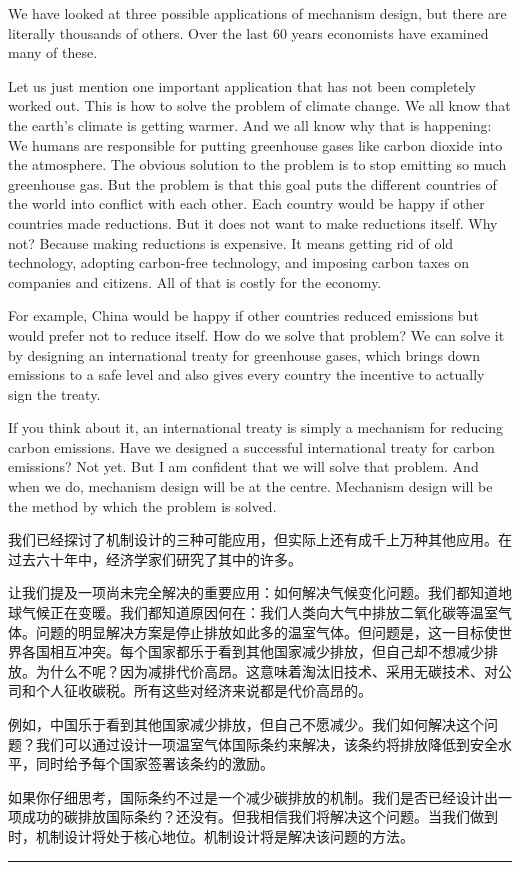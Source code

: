 \documentclass[12pt,a4paper]{article}
\newenvironment{original}{%
  \par\vspace{4pt}\noindent%
  \color{black}%
  \ignorespaces
}{%
  \par\vspace{2pt}%
}
\newenvironment{translation}{%
  \par\vspace{2pt}\noindent%
  \color{transblue}%
  \ignorespaces
}{%
  \par\vspace{4pt}\hrule\vspace{6pt}%
}
\begin{document}
\begin{original}
We have looked at three possible applications of mechanism design, but there are literally thousands of others. Over the last 60 years economists have examined many of these.

Let us just mention one important application that has not been completely worked out. This is how to solve the problem of climate change. We all know that the earth's climate is getting warmer. And we all know why that is happening: We humans are responsible for putting greenhouse gases like carbon dioxide into the atmosphere. The obvious solution to the problem is to stop emitting so much greenhouse gas. But the problem is that this goal puts the different countries of the world into conflict with each other. Each country would be happy if other countries made reductions. But it does not want to make reductions itself. Why not? Because making reductions is expensive. It means getting rid of old technology, adopting carbon-free technology, and imposing carbon taxes on companies and citizens. All of that is costly for the economy.

For example, China would be happy if other countries reduced emissions but would prefer not to reduce itself. How do we solve that problem? We can solve it by designing an international treaty for greenhouse gases, which brings down emissions to a safe level and also gives every country the incentive to actually sign the treaty.

If you think about it, an international treaty is simply a mechanism for reducing carbon emissions. Have we designed a successful international treaty for carbon emissions? Not yet. But I am confident that we will solve that problem. And when we do, mechanism design will be at the centre. Mechanism design will be the method by which the problem is solved.
\end{original}
\begin{translation}
我们已经探讨了机制设计的三种可能应用，但实际上还有成千上万种其他应用。在过去六十年中，经济学家们研究了其中的许多。

让我们提及一项尚未完全解决的重要应用：如何解决气候变化问题。我们都知道地球气候正在变暖。我们都知道原因何在：我们人类向大气中排放二氧化碳等温室气体。问题的明显解决方案是停止排放如此多的温室气体。但问题是，这一目标使世界各国相互冲突。每个国家都乐于看到其他国家减少排放，但自己却不想减少排放。为什么不呢？因为减排代价高昂。这意味着淘汰旧技术、采用无碳技术、对公司和个人征收碳税。所有这些对经济来说都是代价高昂的。

例如，中国乐于看到其他国家减少排放，但自己不愿减少。我们如何解决这个问题？我们可以通过设计一项温室气体国际条约来解决，该条约将排放降低到安全水平，同时给予每个国家签署该条约的激励。

如果你仔细思考，国际条约不过是一个减少碳排放的机制。我们是否已经设计出一项成功的碳排放国际条约？还没有。但我相信我们将解决这个问题。当我们做到时，机制设计将处于核心地位。机制设计将是解决该问题的方法。
\end{translation}
\end{document}
